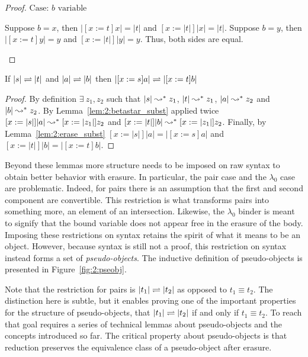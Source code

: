 \begin{proof}
    $\text{Case: }b \text{ variable}$
    \begin{proofcase}
        Suppose $b = x$, then $|[x := t]x| = |t|$ and $[x := |t|]|x| = |t|$.
        Suppose $b = y$, then $|[x := t]y| = y$ and $[x := |t|]|y| = y$.
        Thus, both sides are equal.
    \end{proofcase}
\end{proof}

\begin{lemma}
    \label{lem:2:betaconv_erased_subst}
    If $|s| \rightleftharpoons |t|$ and $|a| \rightleftharpoons |b|$ then $|[x := s]a| \rightleftharpoons |[x := t]b|$
\end{lemma}
\begin{proof}
    By definition $\exists\ z_1, z_2$ such that $|s| \leadsto^* z_1$, $|t| \leadsto^* z_1$, $|a| \leadsto^* z_2$ and $|b| \leadsto^* z_2$.
    By Lemma~\ref{lem:2:betastar_subst} applied twice $[x := |s|]|a| \leadsto^* [x := |z_1|]z_2$ and $[x := |t|]|b| \leadsto^* [x := |z_1|]z_2$.
    Finally, by Lemma~\ref{lem:2:erase_subst} $[x := |s|]|a| = |[x := s]a|$ and $[x := |t|]|b| = |[x := t]b|$.
\end{proof}

Beyond these lemmas more structure needs to be imposed on raw syntax to obtain better behavior with erasure.
In particular, the pair case and the $\lambda_0$ case are problematic.
Indeed, for pairs there is an assumption that the first and second component are convertible.
This restriction is what transforms pairs into something more, an element of an intersection.
Likewise, the $\lambda_0$ binder is meant to signify that the bound variable does not appear free in the erasure of the body.
Imposing these restrictions on syntax retains the spirit of what it means to be an object.
However, because syntax is still not a proof, this restriction on syntax instead forms a set of \textit{pseudo-objects}.
The inductive definition of pseudo-objects is presented in Figure~\ref{fig:2:pseobj}.



Note that the restriction for pairs is $|t_1| \rightleftharpoons |t_2|$ as opposed to $t_1 \equiv t_2$.
The distinction here is subtle, but it enables proving one of the important properties for the structure of pseudo-objects, that $|t_1| \rightleftharpoons |t_2|$ if and only if $t_1 \equiv t_2$.
To reach that goal requires a series of technical lemmas about pseudo-objects and the concepts introduced so far.
The critical property about pseudo-objects is that reduction preserves the equivalence class of a pseudo-object after erasure.

